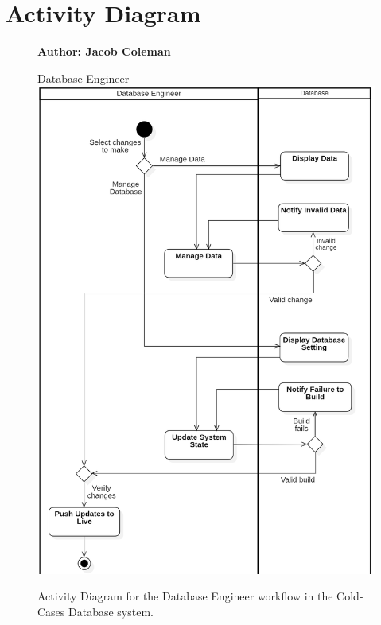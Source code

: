 \documentclass[11pt]{article}
\begin{document}
\section*{Activity Diagram}

\begin{figure}[!ht]
\centering
\textbf{Author: Jacob Coleman}
\vspace{1em}

Database Engineer\\
	\includegraphics[width=.75\textwidth]{./Activity Diagram/activitydiagram_jardee_1.1}\\
	\caption{Activity Diagram for the Database Engineer workflow in the Cold-Cases Database system.}
	\label{fig:activity_diagram}
\end{figure}
\end{document}
